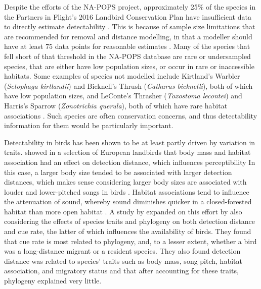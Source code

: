 \documentclass[12pt]{article}
\begin{document}
\par Despite the efforts of the NA-POPS project, approximately 25\% of the species in the Partners in Flight’s 2016 Landbird Conservation Plan \citep{rosenberg_partners_2016} have insufficient data to directly estimate detectability \citep{edwards_point_2023}.
This is because of sample size limitations that are recommended for removal and distance modelling, in that a modeller should have at least 75 data points for reasonable estimates \citep{buckland_introduction_2001, solymos_calibrating_2013}. 
Many of the species that fell short of that threshold in the NA-POPS database are rare or undersampled species, that are either have low population sizes, or occur in rare or inaccessible habitats.
Some examples of species not modelled include Kirtland’s Warbler (\textit{Setophaga kirtlandii}) and Bicknell’s Thrush (\textit{Catharus bicknelli}), both of which have low population sizes, and LeConte’s Thrasher (\textit{Toxostoma lecontei}) and Harris’s Sparrow (\textit{Zonotrichia querula}), both of which have rare habitat associations \citep{will_handbook_2020}. 
Such species are often conservation concerns, and thus detectability information for them would be particularly important.


\par Detectability in birds has been shown to be at least partly driven by variation in traits.
\cite{johnston_species_2014} showed in a selection of European landbirds that body mass and habitat association had an effect on detection distance, which influences perceptibility
In this case, a larger body size tended to be associated with larger detection distances, which makes sense considering larger body sizes are associated with louder and lower-pitched songs in birds \citep{bowman_adaptive_1979, fletcher_acoustics_1999, ryan_role_1985}.
Habitat associations tend to influence the attenuation of sound, whereby sound diminishes quicker in a closed-forested habitat than more open habitat \citep{waide_tropical_1988, yip_sound_2017}.
A study by \cite{solymos_phylogeny_2018} expanded on this effort by also considering the effects of species traits and phylogeny on both detection distance and cue rate, the latter of which influences the availability of birds.
They found that cue rate is most related to phylogeny, and, to a lesser extent, whether a bird was a long-distance migrant or a resident species.
They also found detection distance was related to species’ traits such as body mass, song pitch, habitat association, and migratory status and that after accounting for these traits, phylogeny explained very little.
\end{document}
